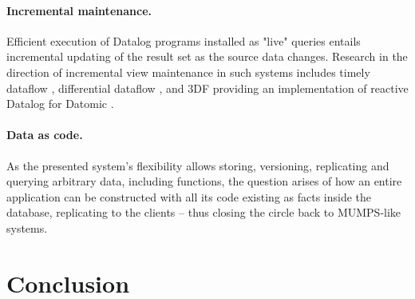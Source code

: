 \paragraph{Incremental maintenance.} Efficient execution of Datalog programs installed as "live" queries entails incremental updating of the result set as the source data changes.
Research in the direction of incremental view maintenance in such systems includes timely dataflow \cite{murray2013naiad}, differential dataflow \cite{mcsherry2013differential}, and 3DF providing an implementation of reactive Datalog for Datomic \cite{gobel2019optimising}.


\paragraph{Data as code.} As the presented system's flexibility allows storing, versioning, replicating and querying arbitrary data, including functions, the question arises of how an entire application can be constructed with all its code existing as facts inside the database, replicating to the clients -- thus closing the circle back to MUMPS-like systems.


\cleardoublepage
\section{Conclusion}
